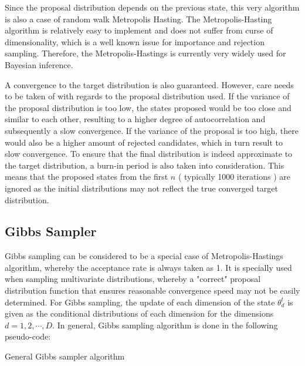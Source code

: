 \documentclass{usiinftr}
\begin{document}
Since the proposal distribution depends on the previous state, this very algorithm is also a case of random walk Metropolis Hasting. The Metropolis-Hasting algorithm is relatively easy to implement and does not suffer from curse of dimensionality, which is a well known issue for importance and rejection sampling. Therefore, the Metropolis-Hastings is currently very widely used for Bayesian inference. 

A convergence to the target distribution is also guaranteed. However, care needs to be taken of with regards to the proposal distribution used. If the variance of the proposal distribution is too low, the states proposed would be too close and similar to each other, resulting to a higher degree of autocorrelation and subsequently a slow convergence. If the variance of the proposal is too high, there would also be a higher amount of rejected candidates, which in turn result to slow convergence. To ensure that the final distribution is indeed approximate to the target distribution, a burn-in period is also taken into consideration. This means that the proposed states from the first $n$ ( typically 1000 iterations ) are ignored as the initial distributions may not reflect the true converged target distribution.


\subsection{Gibbs Sampler} 
Gibbs sampling can be considered to be a special case of Metropolis-Hastings algorithm, whereby the acceptance rate is always taken as 1. It is specially used when sampling multivariate distributions, whereby a "correct" proposal distribution function that ensures reasonable convergence speed may not be easily determined. For Gibbs sampling, the update of each dimension of the state $\theta^{t}_d$ is given as the conditional distributions of each dimension for the dimensions $d = 1,2,\cdots,D$. In general, Gibbs sampling algorithm is done in the following pseudo-code:

\begin{algorithm}[h]
  \caption{General Gibbs sampler algorithm} \label{algGibbs}
  \begin{algorithmic}[1]
    \Statex
    	\State { $ \vdots $ }
    \EndFor
    \State \Return{$\theta$}
    \EndFunction
  \end{algorithmic}
\end{algorithm}
\end{document}
